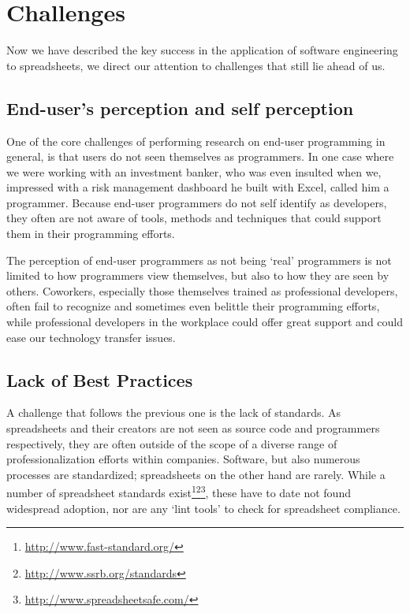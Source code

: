 \documentclass[conference]{IEEEtran}
\begin{document}

\section{Challenges} 
Now we have described the key success in the application of software engineering to spreadsheets, we direct our attention to challenges that still lie ahead of us. 

\subsection{End-user's perception and self perception}
One of the core challenges of performing research on end-user programming in general, is that users do not seen themselves as programmers.  In one case where we were working with an investment banker, who was even insulted when we, impressed with a risk management dashboard he built with Excel, called him a programmer. Because end-user programmers do not self identify as developers, they often are not aware of tools, methods and techniques that could support them in their programming efforts.

The perception of end-user programmers as not being `real' programmers is not limited to how programmers view themselves, but also to how they are seen by others. Coworkers, especially those themselves trained as professional developers, often fail to recognize and sometimes even belittle their programming efforts, while professional developers in the workplace could offer great support and could ease our technology transfer issues. 

\subsection{Lack of Best Practices}
A challenge that follows the previous one is the lack of standards. As spreadsheets and their creators are not seen as source code and programmers respectively, they are often outside of the scope of a diverse range of professionalization efforts within companies. Software, but also numerous processes are standardized; spreadsheets on the other hand are rarely. While a number of spreadsheet standards exist\footnote{\url{http://www.fast-standard.org/}}\footnote{\url{http://www.ssrb.org/standards}}\footnote{\url{http://www.spreadsheetsafe.com/}}, these have to date not found widespread adoption, nor are any `lint tools' to check for spreadsheet compliance. 
\end{document}

